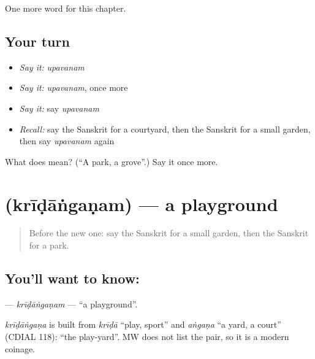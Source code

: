 \begin{grammarlens}[title={What you've built}]
One more word for this chapter.
\end{grammarlens}

\subsection*{Your turn}
\begin{itemize}
\raggedright
  \item \emph{Say it:} \emph{upavanam}
  \item \emph{Say it:} \emph{upavanam}, once more
  \item \emph{Say it:} say \emph{upavanam}
  \item \emph{Recall:} say the Sanskrit for a courtyard, then the Sanskrit for a small garden, then say \emph{upavanam} again
\end{itemize}

\begin{tcolorbox}[breakable,colback=teal!4,colframe=teal!35!black,title={Before you move on}]
What does  mean? (\textquotedblleft{}A park, a grove\textquotedblright{}.) Say it once more.
\end{tcolorbox}
\section[\texorpdfstring{\sk{क्रीडांगणम्} (krīḍāṅgaṇam)}{क्रीडांगणम् (krīḍāṅgaṇam)}]{ (krīḍāṅgaṇam) — a playground}

\label{lesson:SA-C164-kridanganam}



\begin{quote}
Before the new one: say the Sanskrit for a small garden, then the Sanskrit for a park.
\end{quote}

\subsection*{You'll want to know: }
\textbf{} — \emph{krīḍāṅgaṇam} — \textquotedblleft{}a playground\textquotedblright{}.

\begin{cousinweb}
\emph{krīḍāṅgaṇa} is built from \emph{krīḍā} \textquotedblleft{}play, sport\textquotedblright{} and \emph{aṅgaṇa} \textquotedblleft{}a yard, a court\textquotedblright{} (CDIAL 118): \textquotedblleft{}the play-yard\textquotedblright{}. MW does not list the pair, so it is a modern coinage.
\end{cousinweb}

